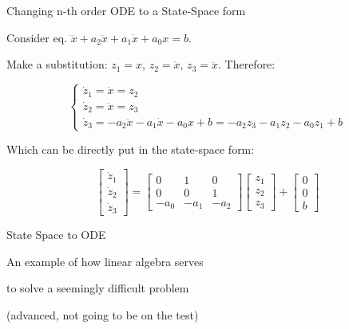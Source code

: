 \documentclass{beamer}
\begin{document}
\begin{frame}{Changing n-th order ODE to a State-Space form}
\begin{flushleft}

Consider eq. $\dddot{x} + a_2 \ddot{x} + a_1 \dot{x} + a_0 x = b$.

\bigskip

Make a substitution: $z_1 = x$, $z_2 = \dot{x}$, $z_3 = \ddot{x}$. Therefore:

\begin{equation}
    \begin{cases}
        \dot{z}_1 = \dot{x} = z_2 \\
        \dot{z}_2 = \ddot{x} = z_3 \\
        \dot{z}_3 =  -a_2 \ddot{x} - a_1 \dot{x} - a_0 x + b = 
        -a_2 z_3 - a_1 z_2 - a_0 z_1 + b
    \end{cases}
\end{equation}

Which can be directly put in the state-space form:

\begin{equation}
\begin{bmatrix}
\dot{z}_1 \\ \dot{z}_2 \\ \dot{z}_3
\end{bmatrix} 
=
\begin{bmatrix}
0 & 1 & 0 \\ 
0 & 0 & 1 \\
-a_0 & -a_1 & -a_2
\end{bmatrix} 
\begin{bmatrix}
z_1 \\ z_2 \\ z_3
\end{bmatrix} 
+ 
\begin{bmatrix}
0 \\ 0 \\ b
\end{bmatrix}
\end{equation}


\end{flushleft}
\end{frame}



\begin{frame}{State Space to ODE}
\centerline{An example of how linear algebra serves}
\centerline{to solve a seemingly difficult problem}
\bigskip
\centerline{(advanced, not going to be on the test)}
\end{frame}
\end{document}
